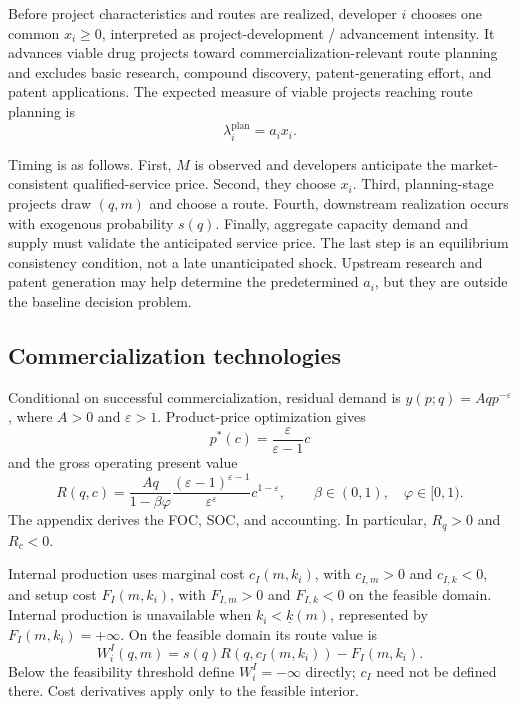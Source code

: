\documentclass[11pt]{article}
\begin{document}
Before project characteristics and routes are realized, developer \(i\)
chooses one common \(x_i\geq0\), interpreted as project-development / advancement intensity. It advances viable
drug projects toward commercialization-relevant route planning and excludes
basic research, compound discovery,
patent-generating effort, and patent applications. The expected measure of
viable projects reaching route planning is
\begin{equation}
  \lambda_i^{\mathrm{plan}}=a_ix_i.
  \label{eq:p16m-planning}
\end{equation}

Timing is as follows. First, \(M\) is observed and developers anticipate the
market-consistent qualified-service price. Second, they choose \(x_i\).
Third, planning-stage projects draw \((q,m)\) and choose a route. Fourth,
downstream realization occurs with exogenous probability \(s(q)\). Finally,
aggregate capacity demand and supply must validate the anticipated service
price. The last step is an equilibrium consistency condition, not a late
unanticipated shock. Upstream research and patent generation may help
determine the predetermined \(a_i\), but they are outside the baseline
decision problem.

\subsection{Commercialization technologies}
\label{subsec:p16m-technologies}

Conditional on successful commercialization, residual demand is
\(y(p;q)=Aqp^{-\varepsilon}\), where \(A>0\) and \(\varepsilon>1\).
Product-price optimization gives
\[
  p^*(c)=\frac{\varepsilon}{\varepsilon-1}c
\]
and the gross operating present value
\begin{equation}
  R(q,c)
  =
  \frac{Aq}{1-\beta\varphi}
  \frac{(\varepsilon-1)^{\varepsilon-1}}
       {\varepsilon^\varepsilon}
  c^{1-\varepsilon},
  \qquad
  \beta\in(0,1),\quad \varphi\in[0,1).
  \label{eq:p16m-return}
\end{equation}
The appendix derives the FOC, SOC, and accounting. In particular,
\(R_q>0\) and \(R_c<0\).

Internal production uses marginal cost \(c_I(m,k_i)\), with
\(c_{I,m}>0\) and \(c_{I,k}<0\), and setup cost \(F_I(m,k_i)\), with
\(F_{I,m}>0\) and \(F_{I,k}<0\) on the feasible domain. Internal production
is unavailable when \(k_i<\underline{k}(m)\), represented by
\(F_I(m,k_i)=+\infty\). On the feasible domain its route value is
\begin{equation}
  W_i^I(q,m)
  =
  s(q)R\!\left(q,c_I(m,k_i)\right)-F_I(m,k_i).
  \label{eq:p16m-internal}
\end{equation}
Below the feasibility threshold define \(W_i^I=-\infty\) directly;
\(c_I\) need not be defined there. Cost derivatives apply only to the feasible interior.
\end{document}

